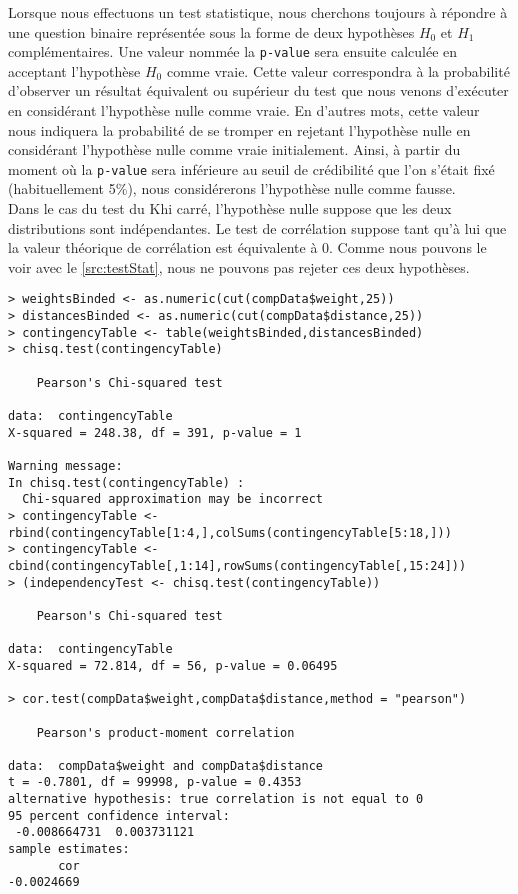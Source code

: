 Lorsque nous effectuons un test statistique, nous cherchons toujours à répondre à une question binaire représentée sous la forme de deux hypothèses $H_0$ et $H_1$ complémentaires. Une valeur nommée la \texttt{p-value} sera ensuite calculée en acceptant l'hypothèse $H_0$ comme vraie. Cette valeur correspondra à la probabilité d'observer un résultat équivalent ou supérieur du test que nous venons d'exécuter en considérant l'hypothèse nulle comme vraie. En d'autres mots, cette valeur nous indiquera la probabilité de se tromper en rejetant l'hypothèse nulle en considérant l'hypothèse nulle comme vraie initialement. Ainsi, à partir du moment où la \texttt{p-value} sera inférieure au seuil de crédibilité que l'on s'était fixé (habituellement 5\%), nous considérerons l'hypothèse nulle comme fausse. \\ 

Dans le cas du test du Khi carré, l'hypothèse nulle suppose que les deux distributions sont indépendantes. Le test de corrélation suppose tant qu'à lui que la valeur théorique de corrélation est équivalente à 0. Comme nous pouvons le voir avec le \autoref{src:testStat}, nous ne pouvons pas rejeter ces deux hypothèses. \\

\begin{lstlisting}[caption = Tests d'indépendance et de corrélation entre distributions,label=src:testStat]
> weightsBinded <- as.numeric(cut(compData$weight,25))
> distancesBinded <- as.numeric(cut(compData$distance,25))
> contingencyTable <- table(weightsBinded,distancesBinded)
> chisq.test(contingencyTable)

	Pearson's Chi-squared test

data:  contingencyTable
X-squared = 248.38, df = 391, p-value = 1

Warning message:
In chisq.test(contingencyTable) :
  Chi-squared approximation may be incorrect
> contingencyTable <- rbind(contingencyTable[1:4,],colSums(contingencyTable[5:18,]))
> contingencyTable <- cbind(contingencyTable[,1:14],rowSums(contingencyTable[,15:24]))
> (independencyTest <- chisq.test(contingencyTable))

	Pearson's Chi-squared test

data:  contingencyTable
X-squared = 72.814, df = 56, p-value = 0.06495

> cor.test(compData$weight,compData$distance,method = "pearson")

	Pearson's product-moment correlation

data:  compData$weight and compData$distance
t = -0.7801, df = 99998, p-value = 0.4353
alternative hypothesis: true correlation is not equal to 0
95 percent confidence interval:
 -0.008664731  0.003731121
sample estimates:
       cor 
-0.0024669 
\end{lstlisting}

